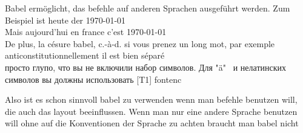 \documentclass{article}
\begin{document}
		Babel ermöglicht, das befehle auf anderen Sprachen ausgeführt werden. Zum Beispiel ist
		heute der \today \\
		Mais aujourd'hui en france c'est \today \\
		De plus, la césure babel, c.-à-d. si vous prenez un long mot, par exemple anticonstitutionnellement il est bien séparé \\
		просто глупо, что вы не включили набор символов. Для "ä" \ и нелатинских символов вы должны использовать [T1] {fontenc}
	
		Also ist es schon sinnvoll babel zu verwenden wenn man befehle benutzen will, die auch das layout beeinflussen. Wenn man nur eine andere Sprache benutzen will ohne auf die Konventionen der Sprache zu achten braucht man babel nicht  

	
	
\end{document}
